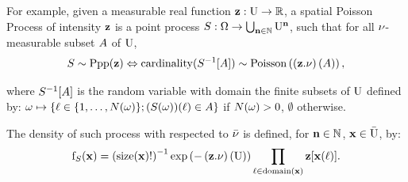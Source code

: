 For example, given a measurable real function $\mathbf{z} :\mathrm{U} \to\mathbb{R}$, a spatial Poisson Process of intensity $\mathbf{z}$ is a point process 
$S:\Omega\to\bigcup_{\mathbf{n}\in\mathbb{N}}\mathrm{U}^{\mathbf{n}}$, such that 
for all $\nu$-measurable subset $A$ of $\mathrm{U}$, \begin{equation}\label{eq:poissonprocess}
S\sim\mathrm{Ppp}(\mathbf{z})\Leftrightarrow
\mathrm{cardinality}(S^{-1}[A])\sim \mathrm{Poisson}\left((\mathbf{z}.\nu)\left(A \right)\right),
\end{equation}

where $S^{-1}[A]$  is the random variable with domain the finite subsets of $\mathrm{U}$ defined by: $\omega\mapsto\{\ell\in\{1,\ldots,N(\omega)\};(S(\omega))(\ell)\in A\}$ if $N(\omega)>0$, $\emptyset$ otherwise.

The density of such process with respected to $\bar{\nu}$ is defined, for $\mathbf{n}\in\mathbb{N}$, $\mathbf{x}\in \bar{\mathrm{U}}$, by:
\begin{equation}
\mathrm{f}_{S}(\mathbf{x})=\left(\mathrm{size} (\mathbf{x})!\right)^{-1}\exp\left(-\left(\mathbf{z}.\nu\right)(\mathrm{U})\right)
\prod_{\ell\in\mathrm{domain}(\mathbf{x})}
\mathbf{z}[\mathbf{x}(\ell)].
\end{equation}



%


